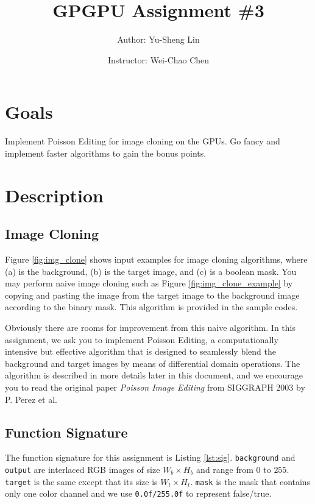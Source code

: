 \documentclass[12pt,a4paper]{article}
\newcommand{\figref}[1]{Figure \ref{fig:#1}}
\newcommand{\lstref}[1]{Listing \ref{lst:#1}}
\begin{document}
\title{GPGPU Assignment \#3}
\author{Author: Yu-Sheng Lin \and Instructor: Wei-Chao Chen}
\maketitle

\section{Goals}

Implement Poisson Editing for image cloning on the GPUs.  Go fancy and implement faster algorithms to gain the bonus points.

\section{Description}

\subsection{Image Cloning}

\figref{img_clone} shows input examples for image cloning algorithms, where
(a) is the background, (b) is the target image, and (c) is a boolean mask.
You may perform naive image cloning such as \figref{img_clone_example} by 
copying and pasting the image from the target image
to the background image according to the binary mask.
This algorithm is provided in the sample codes.

Obviously there are rooms for improvement from this naive algorithm.
In this assignment, we ask you to implement Poisson Editing, 
a computationally intensive but effective algorithm that is designed to seamlessly blend the background
and target images by means of differential domain operations.
The algorithm is described in more details later in this document, and 
we encourage you to read the original paper \textit{Poisson Image Editing} from SIGGRAPH 2003 by P. Perez et al.

\subsection{Function Signature}

The function signature for this assignment is \lstref{sig}.
\verb+background+ and \verb+output+ are
interlaced RGB images of size $W_b\times H_b$ and
range from $0$ to $255$.
\verb+target+ is the same except that its size is $W_t\times H_t$.
\verb+mask+ is the mask that contains only one color channel and
we use \verb+0.0f/255.0f+ to represent false/true.
\end{document}
